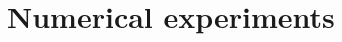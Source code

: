 \documentclass[10pt]{article} %
\newcommand{\E}{\mathbb{E}}
\theoremstyle{plain}
\theoremstyle{definition}
\theoremstyle{remark}
\renewcommand{\L}{\mathscr{L}}
\newcommand{\norm}[1]{\left\|#1\right\|}
\newcommand{\C}{\mathcal C}
\newcommand{\N}{\mathcal N}
\begin{document}

\section{Numerical experiments}\label{sec: Numerics}


\end{document}
